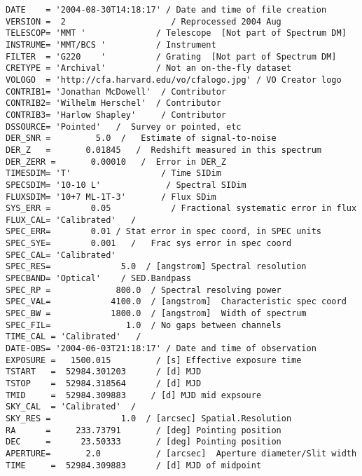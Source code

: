 {\begin{verbatim}
DATE    = '2004-08-30T14:18:17' / Date and time of file creation
VERSION =  2                     / Reprocessed 2004 Aug
TELESCOP= 'MMT '              / Telescope  [Not part of Spectrum DM]
INSTRUME= 'MMT/BCS '          / Instrument
FILTER  = 'G220    '          / Grating  [Not part of Spectrum DM]
CRETYPE = 'Archival'          / Not an on-the-fly dataset
VOLOGO  = 'http://cfa.harvard.edu/vo/cfalogo.jpg' / VO Creator logo
CONTRIB1= 'Jonathan McDowell'  / Contributor
CONTRIB2= 'Wilhelm Herschel'  / Contributor
CONTRIB3= 'Harlow Shapley'     / Contributor
DSSOURCE= 'Pointed'   /  Survey or pointed, etc
DER_SNR =         5.0  /   Estimate of signal-to-noise
DER_Z   =       0.01845   /  Redshift measured in this spectrum
DER_ZERR =       0.00010   /  Error in DER_Z
TIMESDIM= 'T'                  / Time SIDim 
SPECSDIM= '10-10 L'             / Spectral SIDim
FLUXSDIM= '10+7 ML-1T-3'       / Flux SDim
SYS_ERR =        0.05            / Fractional systematic error in flux
FLUX_CAL= 'Calibrated'   /
SPEC_ERR=        0.01 / Stat error in spec coord, in SPEC units
SPEC_SYE=        0.001   /   Frac sys error in spec coord
SPEC_CAL= 'Calibrated'
SPEC_RES=              5.0  / [angstrom] Spectral resolution
SPECBAND= 'Optical'    / SED.Bandpass
SPEC_RP =             800.0  / Spectral resolving power
SPEC_VAL=            4100.0  / [angstrom]  Characteristic spec coord
SPEC_BW =            1800.0  / [angstrom]  Width of spectrum
SPEC_FIL=               1.0  / No gaps between channels
TIME_CAL = 'Calibrated'   /
DATE-OBS= '2004-06-03T21:18:17' / Date and time of observation
EXPOSURE =   1500.015         / [s] Effective exposure time
TSTART   =  52984.301203      / [d] MJD
TSTOP    =  52984.318564      / [d] MJD
TMID     =  52984.309883     / [d] MJD mid expsoure
SKY_CAL  = 'Calibrated'  /
SKY_RES =              1.0  / [arcsec] Spatial.Resolution
RA      =     233.73791       / [deg] Pointing position
DEC     =      23.50333       / [deg] Pointing position
APERTURE=       2.0           / [arcsec]  Aperture diameter/Slit width
TIME     =  52984.309883      / [d] MJD of midpoint



\end{verbatim}}
